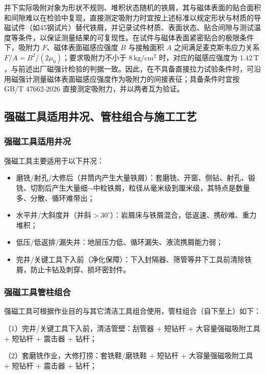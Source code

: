 井下实际吸附对象为形状不规则、堆积状态随机的铁屑，其与磁体表面的贴合面积和间隙难以在检验中复现，直接测定吸附力时宜按上述标准以规定形状与材质的导磁试件（如45钢试片）替代铁屑，并记录试件材质、表面状态、贴合间隙与测试温度等条件，以保证测量结果的可复现性。在试件与磁体表面紧密贴合的极限条件下，吸附力 $F$、磁体表面磁感应强度 $B$ 与接触面积 $A$ 之间满足麦克斯韦应力关系 $F/A=B^{2}/(2\mu_0)$；要求吸附力不小于 $8\,\mathrm{kg/cm^2}$ 时，对应的磁感应强度为 $1.42\,\mathrm{T}$，与前述出厂磁强计检验的判据一致。因此，在不具备直接拉力试验条件时，可沿用磁强计测量磁体表面磁感应强度作为吸附力的间接表征；具备条件时宜按 GB/T 47662-2026 直接测定吸附力，并以两者互为验证。


\subsection{强磁工具适用井况、管柱组合与施工工艺}

\subsubsection{强磁工具适用井况}

强磁工具主要适用于以下井况：

\begin{itemize}
	\item 磨铣/射孔/大修后（井筒内产生大量铁屑）：套磨铣、开窗、侧钻、射孔、锻铣、切割后产生大量细$\sim$中粒铁屑，粒径从毫米级到厘米级，其特点是数量多、分散、循环难带出；
	\item 水平井/大斜度井（井斜$> 30^\circ$）：岩屑床与铁屑混合，低返速、携砂难、重力堆积；
	\item 低压/低返排/漏失井：地层压力低、循环漏失、液流携屑能力弱；
	\item 完井/关键工具下入前（净化保障）：下入封隔器、筛管等井下工具前清除铁屑，防止卡钻及刺穿、损坏密封件。
\end{itemize}

\subsubsection{强磁工具管柱组合}

强磁工具可根据作业目的与其它清洁工具组合使用，管柱组合（自下至上）如下：

（1）完井/关键工具下入前，清洁管壁：刮管器 $+$ 短钻杆 $+$ 大容量强磁吸附工具 $+$ 短钻杆 $+$ 震击器 $+$ 钻杆；

（2）套磨铣作业，大修打捞：套铣鞋/磨铣鞋 $+$ 短钻杆 $+$ 大容量强磁吸附工具 $+$ 短钻杆 $+$ 震击器 $+$ 钻杆；


